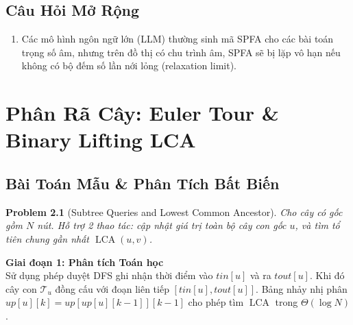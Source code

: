 \documentclass[11pt, letterpaper]{report}
\newtheorem{baitoan}{Problem}[chapter]
\begin{document}
\section{Câu Hỏi Mở Rộng}
\begin{enumerate}
 \item Các mô hình ngôn ngữ lớn (LLM) thường sinh mã SPFA cho các bài toán trọng số âm, nhưng trên đồ thị có chu trình âm, SPFA sẽ bị lặp vô hạn nếu không có bộ đếm số lần nới lỏng (relaxation limit).
\end{enumerate}

\chapter{Phân Rã Cây: Euler Tour \& Binary Lifting LCA}
\label{mod:tree_lca}

\section{Bài Toán Mẫu \& Phân Tích Bất Biến}
\begin{baitoan}[Subtree Queries and Lowest Common Ancestor]
Cho cây có gốc gồm $N$ nút. Hỗ trợ 2 thao tác: cập nhật giá trị toàn bộ cây con gốc $u$, và tìm tổ tiên chung gần nhất $\operatorname{LCA}(u, v)$.
\end{baitoan}

\noindent\textbf{Giai đoạn 1: Phân tích Toán học}\\
Sử dụng phép duyệt DFS ghi nhận thời điểm vào $tin[u]$ và ra $tout[u]$. Khi đó cây con $\mathcal{T}_u$ đồng cấu với đoạn liên tiếp $[tin[u], tout[u]]$. Bảng nhảy nhị phân $up[u][k] = up[up[u][k-1]][k-1]$ cho phép tìm $\operatorname{LCA}$ trong $\Theta(\log N)$.
\end{document}
